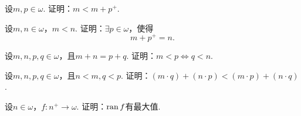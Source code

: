 \begin{example}
设\(m,p\in\omega\).
证明：\(m<m+p^+\).
\end{example}

\begin{example}
设\(m,n\in\omega\)，\(m<n\).
证明：\(\exists p\in\omega\)，使得\[
	m+p^+=n.
\]
\end{example}

\begin{example}
设\(m,n,p,q\in\omega\)，且\(m+n=p+q\).
证明：\(m<p \iff q<n\).
\end{example}

\begin{example}
设\(m,n,p,q\in\omega\)，且\(n<m,q<p\).
证明：\((m \cdot q)+(n \cdot p)<(m \cdot p)+(n \cdot q)\).
\end{example}

\begin{example}
设\(n\in\omega\)，\(f\colon n^+\to\omega\).
证明：\(\operatorname{ran} f\)有最大值.
\end{example}
